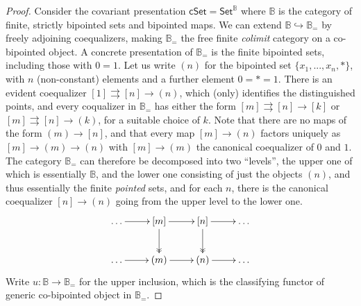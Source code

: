 \documentclass[11pt,reqno]{amsart}
\newcommand{\B}{\ensuremath{\mathbb{B}}}
\newcommand{\Set}{\ensuremath{\mathsf{Set}}}
\newcommand{\cSet}{\ensuremath{\mathsf{cSet}}}
\newcommand{\hook}{\ensuremath{\hookrightarrow}}
\renewcommand{\to}{\ensuremath{\rightarrow}}
\theoremstyle{remark}
\theoremstyle{definition}
\begin{document}
\begin{proof}
Consider the covariant presentation $\cSet = \Set^\B$ where $\B$ is the category of finite, strictly bipointed sets and bipointed maps.  We can extend $\B\hook\B_=$ by freely adjoining coequalizers, making $\B_=$ the free finite \emph{colimit} category on a co-bipointed object. A concrete presentation of $\B_=$ is the finite bipointed sets, including those with $0=1$.  Let us write $(n)$ for the bipointed set $\{x_1, ..., x_n, *\}$, with $n$ (non-constant) elements and a further element $0=*=1$.  There is an evident coequalizer $[1]\rightrightarrows [n]\to(n)$, which (only) identifies the distinguished points, and every coqualizer in $\B_=$ has either the form $[m]\rightrightarrows [n]\to [k]$ or $[m]\rightrightarrows [n]\to(k)$, for a suitable choice of $k$.  Note that there are no maps of the form $(m)\to [n]$, and that every map $[m]\to (n)$ factors uniquely as $[m]\to (m)\to (n)$ with  $[m]\to(m)$ the canonical coequalizer of $0$ and $1$.  The category $\B_=$ can therefore be decomposed into two ``levels'', the upper one of which is essentially $\B$, and the lower one consisting of just the objects $(n)$, and thus essentially the finite \emph{pointed} sets, and for each $n$, there is the canonical coequalizer $[n]\to(n)$ going from the upper level to the lower one.
\[
\xymatrix{
\dots \ar[r] & [m] \ar@{->>}[d] \ar[r] & [n] \ar@{->>}[d] \ar[r] & \dots \\
\dots \ar[r] & (m) \ar[r] & (n) \ar[r] & \dots
}
\]
Write $u : \B\to\B_=$ for the upper inclusion, which is the classifying functor of generic co-bipointed object in $\B_=$.  


\end{proof}
\end{document}
